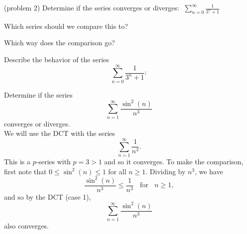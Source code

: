 \documentclass[handout]{ximera}
\begin{document}
\begin{problem}(problem 2)
Determine if the series converges or diverges: $\;\displaystyle \sum_{n=0}^\infty \frac{1}{3^n + 1}$

Which series should we compare this to?

\begin{multipleChoice}
\end{multipleChoice}

Which way does the comparison go?
\begin{multipleChoice}
\end{multipleChoice}

Describe the behavior of the series 
\[
\sum_{n=0}^\infty \frac{1}{3^n + 1}:
\]

\begin{multipleChoice}
\end{multipleChoice}

\end{problem}



\begin{example}[example 3] %
Determine if the series 
\[
\sum_{n=1}^\infty \frac{\sin^2(n)}{n^3}
\]
 converges or diverges.\\
We will use the DCT with the series 
\[
\sum_{n=1}^\infty \frac{1}{n^3}.
\]
This is a $p$-series with $p=3 >1$ and so it converges.
To make the comparison, first note that $0 \leq \sin^2(n) \leq 1$ for all $n \geq 1$. Dividing by $n^3$,
we have 
\[
\frac{\sin^2(n)}{n^3} \leq \frac{1}{n^3} \; \; \text{ for } \; \; n \geq 1,
\]
and so by the DCT (case 1), 
\[
\sum_{n=1}^\infty \frac{\sin^2(n)}{n^3}
\]
 also converges.
\end{example}
\end{document}
